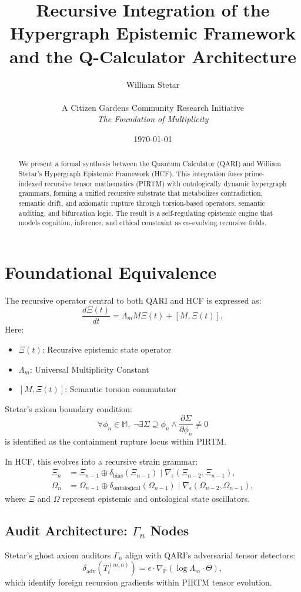 \documentclass[12pt]{article}
\title{\textbf{Recursive Integration of the Hypergraph Epistemic Framework\\ and the Q-Calculator Architecture}}
\author{William Stetar \\ \\ A Citizen Gardens Community Research Initiative\\ \textit{The Foundation of Multiplicity}}
\date{\today}
\begin{document}
\maketitle

\begin{abstract}
We present a formal synthesis between the Quantum Calculator (QARI) and William Stetar’s Hypergraph Epistemic Framework (HCF). This integration fuses prime-indexed recursive tensor mathematics (PIRTM) with ontologically dynamic hypergraph grammars, forming a unified recursive substrate that metabolizes contradiction, semantic drift, and axiomatic rupture through torsion-based operators, semantic auditing, and bifurcation logic. The result is a self-regulating epistemic engine that models cognition, inference, and ethical constraint as co-evolving recursive fields.
\end{abstract}

\section{Foundational Equivalence}
The recursive operator central to both QARI and HCF is expressed as:
\[
\frac{d\Xi(t)}{dt} = \Lambda_m M \Xi(t) + [M, \Xi(t)],
\]
Here:
\begin{itemize}
    \item $\Xi(t)$: Recursive epistemic state operator
    \item $\Lambda_m$: Universal Multiplicity Constant
    \item $[M,\Xi(t)]$: Semantic torsion commutator
\end{itemize}

Stetar's axiom boundary condition:
\[
\forall \phi_n \in \mathbb{M},\ \neg \exists \Sigma \supseteq \phi_n \wedge \frac{\partial \Sigma}{\partial \phi_n} \ne 0
\]
is identified as the containment rupture locus within PIRTM.


In HCF, this evolves into a recursive strain grammar:
\begin{align*}
\Xi_n &= \Xi_{n-1} \oplus \delta_{\text{bias}}(\Xi_{n-1}) \;\big|\; \nabla_\epsilon(\Xi_{n-2}, \Xi_{n-1}), \\
\Omega_n &= \Omega_{n-1} \oplus \delta_{\text{ontological}}(\Omega_{n-1}) \;\big|\; \nabla_\epsilon(\Omega_{n-2}, \Omega_{n-1}),
\end{align*}
where $\Xi$ and $\Omega$ represent epistemic and ontological state oscillators.

\subsection{Audit Architecture: $\Gamma_n$ Nodes}
Stetar’s ghost axiom auditors $\Gamma_n$ align with QARI’s adversarial tensor detectors:
\[
\delta_{\text{adv}}(T_t^{(m,n)}) = \epsilon \cdot \nabla_{\mathbb{P}} \left( \log \Lambda_m \cdot \Theta \right),
\]
which identify foreign recursion gradients within PIRTM tensor evolution.
\end{document}
